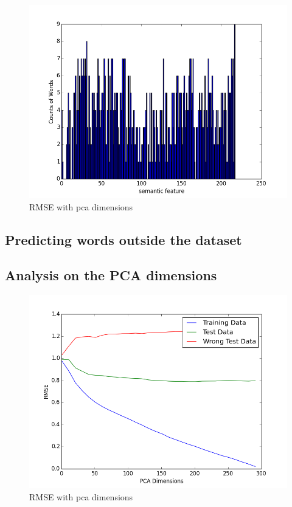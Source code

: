 \documentclass{article} %
\begin{document}
\begin{figure}[h]
\begin{center}
\includegraphics[scale=0.5]{rmse_correct_incorrect_per_semantic_Feature.png}
\end{center}
\caption{RMSE with pca dimensions}
\end{figure}



\subsection{Predicting words outside the dataset}


\subsection{Analysis on the PCA dimensions}


\begin{figure}[h]
\begin{center}
\includegraphics[scale=0.5]{rmse_with_pca_dimensions.png}
\end{center}
\caption{RMSE with pca dimensions}
\end{figure}
\end{document}
